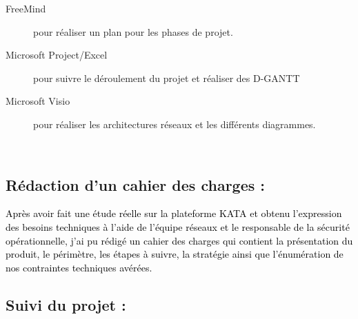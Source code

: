 \documentclass[a4paper,12pt]{report}
\begin{document}
\begin{description}
	\item [FreeMind] pour réaliser un plan pour les phases de projet.	\item [Microsoft Project/Excel] pour suivre le déroulement du projet et réaliser des D-GANTT
	\item [Microsoft Visio] pour réaliser les architectures réseaux et les différents diagrammes.
\end{description}
~~\\
\subsection*{Rédaction d’un cahier des charges :}

\textcolor{black}{Après avoir fait une étude réelle sur la plateforme KATA et obtenu l’expression des besoins techniques à l’aide de l’équipe réseaux et le responsable de la sécurité opérationnelle, j’ai pu rédigé un cahier des charges qui contient la présentation du produit, le périmètre, les étapes à suivre, la stratégie ainsi que l’énumération de nos contraintes techniques avérées.}
~~\\
\subsection*{Suivi du projet :}
\end{document}
